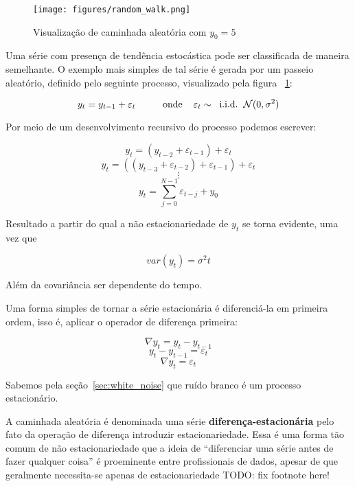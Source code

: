 \begin{figure}[h]
    \centering
    \texttt{[image: figures/random\_walk.png]}
    \caption{Visualização de caminhada aleatória com $y_0=5$}
    \label{fig:random_walk}
\end{figure}

Uma série com presença de tendência estocástica pode ser classificada de
maneira semelhante. O exemplo mais simples de tal série é gerada por um
passeio aleatório, definido pelo seguinte processo, visualizado pela figura
~\ref{fig:random_walk}:

$$  y_t = y_{t-1} + \varepsilon_t  \hspace{1cm}\text{onde} \hspace{.4cm}\varepsilon_t \sim \hspace{.2cm}\text{i.i.d.} \hspace{.2cm}\mathcal{N}(0, \sigma^2)$$

Por meio de um desenvolvimento recursivo do processo podemos escrever:

$$ y_t = (y_{t-2} + \varepsilon_{t-1}) + \varepsilon_{t} $$
$$ y_t = ((y_{t-3} + \varepsilon_{t-2}) + \varepsilon_{t-1}) + \varepsilon_{t} $$
$$ \vdots $$
$$ y_t = \sum_{j=0}^{N-1} \varepsilon_{t-j} + y_0$$
\vspace{1cm}

Resultado a partir do qual a não estacionariedade de $y_t$ se torna evidente,
uma vez que

$$ var(y_t) = \sigma^2 t $$

Além da covariância ser dependente do tempo.

Uma forma simples de tornar a série estacionária é diferenciá-la em primeira
ordem, isso é, aplicar o operador de diferença primeira:

$$ \nabla y_t = y_t - y_{t-1} $$
$$ y_t - y_{t-1} = \varepsilon_t$$
$$ \nabla y_t =  \varepsilon_t$$

Sabemos pela seção~\ref{sec:white_noise} que ruído branco é um processo
estacionário.

A caminhada aleatória é denominada uma série \textbf{diferença-estacionária}
pelo fato da operação de diferença introduzir estacionariedade. Essa é uma
forma tão comum de não estacionariedade que a ideia de ``diferenciar uma
série antes de fazer qualquer coisa'' é proeminente entre profissionais de
dados, apesar de que geralmente necessita-se apenas de estacionariedade
TODO: fix footnote here!

